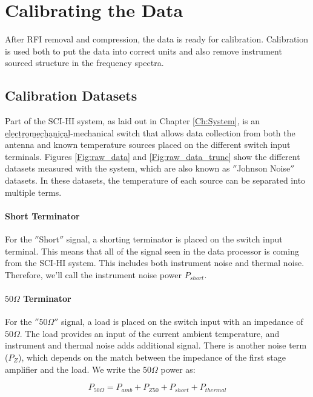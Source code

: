 \section{Calibrating the Data}

After RFI removal and compression, the data is ready for calibration. Calibration is used both to put the data into correct units and also remove instrument sourced structure in the frequency spectra. 


\subsection{Calibration Datasets} \label{Sec:calsource}

Part of the SCI-HI system, as laid out in Chapter \ref{Ch:System}, is an ḛl̰ḛc̰t̰r̰o̰m̰ḛc̰h̰a̰n̰ḭc̰a̰l̰-mechanical switch that allows data collection from both the antenna and known temperature sources placed on the different switch input terminals. Figures \ref{Fig:raw_data} and \ref{Fig:raw_data_trunc} show the different datasets measured with the system, which are also known as $''$Johnson Noise$''$ datasets. In these datasets, the temperature of each source can be separated into multiple terms. 

\paragraph{Short Terminator}

For the $''$Short$''$ signal, a shorting terminator is placed on the switch input terminal. This means that all of the signal seen in the data processor is coming from the SCI-HI system. This includes both instrument noise and thermal noise. Therefore, we'll call the instrument noise power $P_{short}$.

\paragraph{$50 \Omega$ Terminator}

For the $'' 50 \Omega ''$ signal, a load is placed on the switch input with an impedance of $50 \Omega$. The load provides an input of the current ambient temperature, and instrument and thermal noise adds additional signal. There is another noise term ($P_Z$), which depends on the match between the impedance of the first stage amplifier and the load. We write the $50 \Omega$ power as:

\begin{equation}
P_{50 \Omega} = P_{amb}+P_{Z50}+P_{short}+P_{thermal}
\end{equation}

